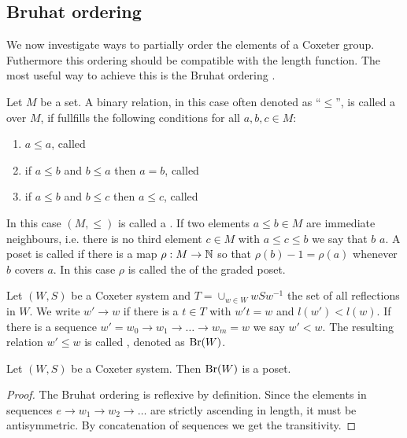 \subsection{Bruhat ordering}
\label{sec:coxeter-groups-bruhat-ordering}

We now investigate ways to partially order the elements of a Coxeter group. Futhermore this ordering should be compatible with the length function. The most useful way to achieve this is the Bruhat ordering \cite[Section 5.9]{humphreys:coxeter}.

\begin{defi}
	Let $M$ be a set. A binary relation, in this case often denoted as ``$\leq$'', is called a  over $M$, if fullfills the following conditions for all $a,b,c \in M$:
	\begin{enumerate}
		\item $a \leq a$, called 
		\item if $a \leq b$ and $b \leq a$ then $a=b$, called 
		\item if $a \leq b$ and $b \leq c$ then $a \leq c$, called 
	\end{enumerate}
	In this case $(M,\leq)$ is called a . If two elements $a \leq b \in M$ are immediate neighbours, i.e. there is no third element $c \in M$ with $a \leq c \leq b$ we say that $b$  $a$. A poset is called  if there is a map $\rho : M \to \mathbb{N}$ so that $\rho(b) - 1 = \rho(a)$ whenever $b$ covers $a$. In this case $\rho$ is called the  of the graded poset.
\end{defi}

\begin{defi}
	Let $(W,S)$ be a Coxeter system and $T = \cup_{w \in W} wSw^{-1}$ the set of all reflections in $W$. We write $w' \to w$ if there is a $t \in T$ with $w't = w$ and $l(w') < l(w)$. If there is a sequence $w' = w_0 \to w_1 \to \ldots \to w_m = w$ we say $w' < w$. The resulting relation $w' \leq w$ is called , denoted as $\operatorname{Br}(W)$.
\end{defi}

\begin{lemm}
	Let $(W,S)$ be a Coxeter system. Then $\operatorname{Br}(W)$ is a poset.

	\begin{proof}
		The Bruhat ordering is reflexive by definition. Since the elements in sequences $e \to w_1 \to w_2 \to \ldots$ are strictly ascending in length, it must be antisymmetric. By concatenation of sequences we get the transitivity.
	\end{proof}
\end{lemm}

